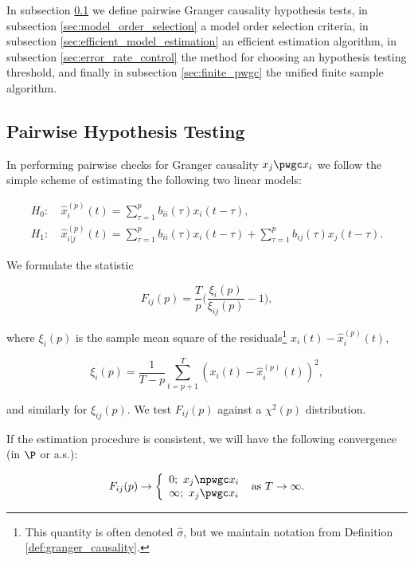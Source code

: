 In subsection \ref{sec:pairwise_hypothesis_testing} we define pairwise
Granger causality hypothesis tests, in subsection
\ref{sec:model_order_selection} a model order selection criteria, in
subsection \ref{sec:efficient_model_estimation} an efficient
estimation algorithm, in subsection \ref{sec:error_rate_control} the
method for choosing an hypothesis testing threshold, and finally in
subsection \ref{sec:finite_pwgc} the unified finite sample algorithm.

\subsection{Pairwise Hypothesis Testing}
\label{sec:pairwise_hypothesis_testing}
In performing pairwise checks for Granger causality $x_j \pwgc x_i$ we
follow the simple scheme of estimating the following two linear models:

\begin{align}
  H_0:&\ \widehat{x}_i^{(p)}(t) = \sum_{\tau = 1}^{p} b_{ii}(\tau)x_i(t - \tau),\\
  H_1:&\ \widehat{x}_{i|j}^{(p)}(t) = \sum_{\tau = 1}^{p} b_{ii}(\tau)x_i(t - \tau) + \sum_{\tau = 1}^pb_{ij}(\tau)x_j(t - \tau).
\end{align}

We formulate the statistic 

\begin{equation}
  \label{eqn:gc_statistics}
  F_{ij}(p) = \frac{T}{p}\Big(\frac{\xi_i(p)}{\xi_{ij}(p)} - 1\Big),
\end{equation}

where $\xi_i(p)$ is the sample mean square of the
residuals\footnote{This quantity is often denoted $\widehat{\sigma}$,
  but we maintain notation from Definition
  \ref{def:granger_causality}.}  $x_i(t) - \widehat{x}^{(p)}_i(t)$,

\begin{equation*}
  \xi_i(p) = \frac{1}{T - p}\sum_{t = p + 1}^T (x_i(t) - \widehat{x}_i^{(p)}(t))^2,
\end{equation*}

and similarly for $\xi_{ij}(p)$.  We test $F_{ij}(p)$ against a
$\chi^2(p)$ distribution.

If the estimation procedure is consistent, we will have the following
convergence (in $\P$ or a.s.):

\begin{equation}
  F_{ij}(p) \rightarrow
  \left\{
    \begin{array}{ll}
      0;\ x_j \npwgc x_i\\
      \infty;\ x_j \pwgc x_i
    \end{array}
  \right. \text{ as } T \rightarrow \infty.  %
\end{equation}

